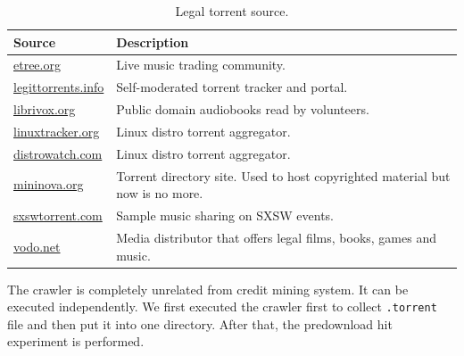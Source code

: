 \begin{table}[h]
	\centering
	\caption{Legal torrent source.}
	\label{tbl:legaltorrentsource}
	\begin{tabular}{lp{9cm}}
		\hline
		Source & Description \\ \hline
		\url{etree.org} & Live music trading community. \\
		\url{legittorrents.info} & Self-moderated torrent tracker and portal. \\
		\url{librivox.org} & Public domain audiobooks read by volunteers. \\
		\url{linuxtracker.org} & Linux distro torrent aggregator. \\
		\url{distrowatch.com} & Linux distro torrent aggregator. \\
		\url{mininova.org} & Torrent directory site. Used to host copyrighted material but now is no more.\\
		\url{sxswtorrent.com} & Sample music sharing on SXSW events. \\
		\url{vodo.net} & Media distributor that offers legal films, books, games and music.

	\end{tabular}
\end{table}

The crawler is completely unrelated from credit mining system. It can be executed independently. We first executed the crawler first to collect \texttt{.torrent} file and then put it into one directory. After that, the predownload hit experiment is performed.

